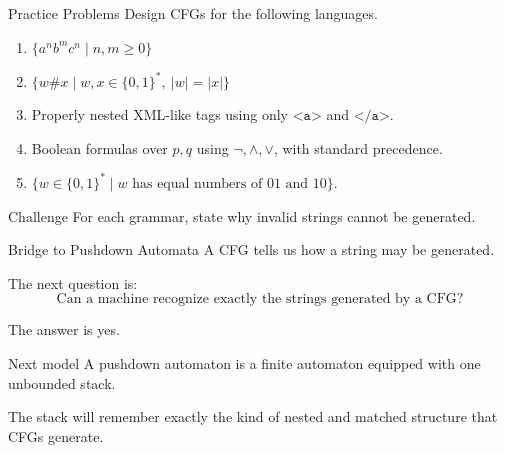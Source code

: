 \documentclass[aspectratio=169,10pt]{beamer}
\newcommand{\code}[1]{\texttt{#1}}
\begin{document}
\begin{frame}{Practice Problems}
\small
Design CFGs for the following languages.

\begin{enumerate}
    \item \(\{a^n b^m c^n\mid n,m\ge0\}\)
    \item \(\{w\#x\mid w,x\in\{0,1\}^*,\ |w|=|x|\}\)
    \item Properly nested XML-like tags using only \(\code{<a>}\) and \(\code{</a>}\).
    \item Boolean formulas over \(p,q\) using \(\neg,\land,\lor\), with standard precedence.
    \item \(\{w\in\{0,1\}^*\mid w\text{ has equal numbers of }01\text{ and }10\}\).
\end{enumerate}

\begin{alertblock}{Challenge}
For each grammar, state why invalid strings cannot be generated.
\end{alertblock}
\end{frame}

\begin{frame}{Bridge to Pushdown Automata}
\small
A CFG tells us how a string may be generated.

\vspace{0.7em}
The next question is:
\[
\boxed{\text{Can a machine recognize exactly the strings generated by a CFG?}}
\]

\vspace{0.7em}
The answer is yes.

\begin{exampleblock}{Next model}
A pushdown automaton is a finite automaton equipped with one unbounded stack.
\end{exampleblock}

\vspace{0.5em}
The stack will remember exactly the kind of nested and matched structure that CFGs generate.
\end{frame}
\end{document}
